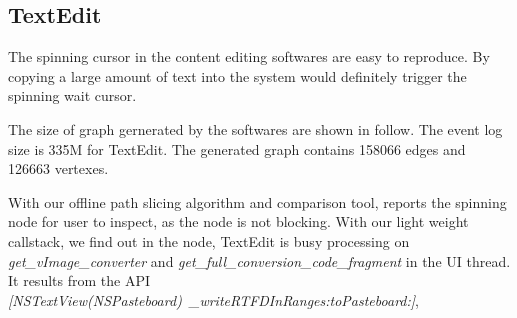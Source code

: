 \subsection{TextEdit}
The spinning cursor in the content editing softwares are easy to reproduce.
By copying a large amount of text into the system would definitely trigger
the spinning wait cursor.

The size of graph gernerated by the softwares are shown in follow.
The event log size is 335M for TextEdit.
The generated graph contains 158066 edges and 126663 vertexes.

With our offline path slicing algorithm and comparison tool,
\xxx reports the spinning node for user to inspect, as the node is
not blocking.
With our light weight callstack, we find out in the node,
TextEdit is busy processing on \textit{get\_vImage\_converter}
and \textit{get\_full\_conversion\_code\_fragment} in the UI thread.
It results from the API \textit{[NSTextView(NSPasteboard)\ \_writeRTFDInRanges:toPasteboard:]},

